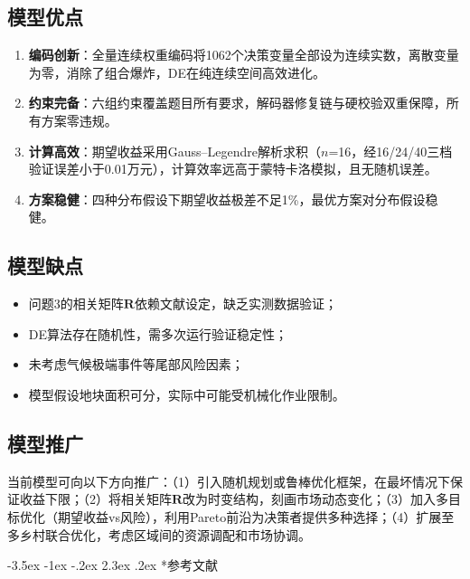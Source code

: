 \documentclass[12pt,a4paper]{article}
\makeatletter
\renewcommand\section{\@startsection{section}{1}{\z@}%
  {-3.5ex \@plus -1ex \@minus -.2ex}%
  {2.3ex \@plus .2ex}%
  {\centering\normalfont\Large\bfseries}}
\makeatother
\begin{document}
\subsection{模型优点}

\begin{enumerate}
  \item \textbf{编码创新}：全量连续权重编码将1062个决策变量全部设为连续实数，离散变量为零，消除了组合爆炸，DE在纯连续空间高效进化。
  \item \textbf{约束完备}：六组约束覆盖题目所有要求，解码器修复链与硬校验双重保障，所有方案零违规。
  \item \textbf{计算高效}：期望收益采用Gauss--Legendre解析求积（$n$=16，经16/24/40三档验证误差小于0.01万元），计算效率远高于蒙特卡洛模拟，且无随机误差。
  \item \textbf{方案稳健}：四种分布假设下期望收益极差不足1\%，最优方案对分布假设稳健。
\end{enumerate}

\subsection{模型缺点}

\begin{itemize}
  \item 问题3的相关矩阵$\mathbf{R}$依赖文献设定，缺乏实测数据验证；
  \item DE算法存在随机性，需多次运行验证稳定性；
  \item 未考虑气候极端事件等尾部风险因素；
  \item 模型假设地块面积可分，实际中可能受机械化作业限制。
\end{itemize}

\subsection{模型推广}

当前模型可向以下方向推广：（1）引入随机规划或鲁棒优化框架，在最坏情况下保证收益下限；（2）将相关矩阵$\mathbf{R}$改为时变结构，刻画市场动态变化；（3）加入多目标优化（期望收益vs风险），利用Pareto前沿为决策者提供多种选择；（4）扩展至多乡村联合优化，考虑区域间的资源调配和市场协调。

\section*{参考文献}
\end{document}
